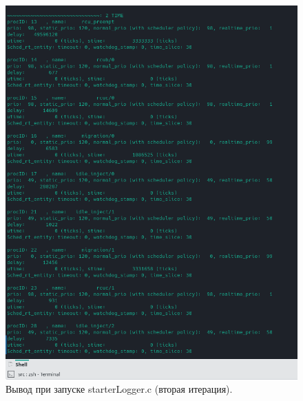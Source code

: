 \begin{figure}[H]
	\centering
	\includegraphics[scale=0.8]{img/secondIt.png}
	\caption{Вывод при запуске starterLogger.c (вторая итерация). }
	\label{fig:secondIt}
\end{figure}

